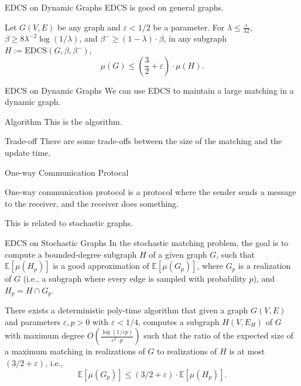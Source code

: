 \documentclass{beamer}
\begin{document}
\begin{frame}{EDCS on Dynamic Graphs}
    EDCS is good on general graphs.
    \begin{lemma}[\cite{AB19}]
        Let $G(V, E)$ be any graph and $\varepsilon < 1/2$ be a parameter. 
        For $\lambda \leq \frac{\varepsilon}{32}$, $\beta \geq 8 \lambda^{-2} \log(1/\lambda)$, and $\beta^{-} \geq (1 - \lambda) \cdot \beta$, 
        in any subgraph $H := \mathrm{EDCS}(G, \beta, \beta^-)$, $$\mu(G) \leq \left(\frac{3}{2} + \varepsilon\right) \cdot \mu(H).$$
    \end{lemma}
\end{frame}

\begin{frame}{EDCS on Dynamic Graphs}
    We can use EDCS to maintain a large matching in a dynamic graph.
    \begin{block}{Algorithm}
        This is the algorithm.
    \end{block}
\end{frame}

\begin{frame}{Trade-off}
    There are some trade-offs between the size of the matching and the update time.
\end{frame}

\begin{frame}{One-way Communication Protocal}
    \begin{definition}
        One-way communication protocol is a protocol where the sender sends a message to the receiver, 
        and the receiver does something.
    \end{definition}
    This is related to stochastic graphs.
\end{frame}

\begin{frame}{EDCS on Stochastic Graphs}
    In the stochastic matching problem, 
    the goal is to compute a bounded-degree subgraph $H$ of a given graph $G$, 
    such that $\mathbb{E}[\mu(H_p)]$ is a good approximation of $\mathbb{E}[\mu(G_p)]$, 
    where $G_p$ is a realization of $G$ (i.e., a subgraph where every edge is sampled with probability $p$), 
    and $H_p = H \cap G_p$.
    \begin{theorem}
        There exists a deterministic poly-time algorithm that given a graph $G(V, E)$ and parameters $\varepsilon, p > 0$ with $\varepsilon < 1/4$, computes a subgraph $H(V, E_H)$ of $G$ with maximum degree $O\left(\frac{\log (1 / \varepsilon p)}{\varepsilon^2 \cdot p} \right)$ such that the ratio of the expected size of a maximum matching in realizations of $G$ to realizations of $H$ is at most $(3/2 + \varepsilon)$, i.e.,
        $$\mathbb{E}[\mu(G_p)] \leq (3/2 + \varepsilon) \cdot \mathbb{E}[\mu(H_p)].$$
    \end{theorem}
\end{frame}
\end{document}
